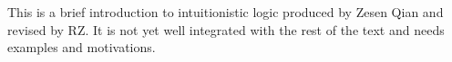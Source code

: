\documentclass[../../include/open-logic-part]{subfiles}
\begin{document}

\begin{editorial}
  This is a brief introduction to intuitionistic logic produced by
  Zesen Qian and revised by RZ. It is not yet well integrated with the
  rest of the text and needs examples and motivations.
\end{editorial}





\OLEndPartHook
\end{document}
